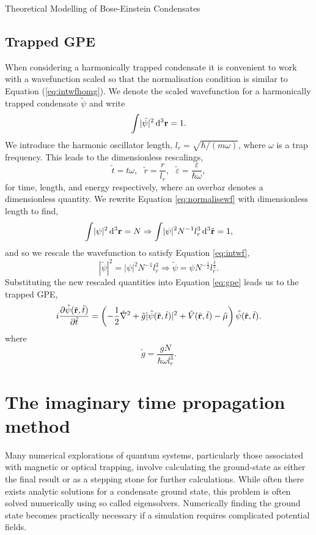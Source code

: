 \begin{chapter}{\label{cha:theoretical_model}Theoretical Modelling of Bose-Einstein Condensates}
	\subsection{\label{section:gpedimlesstrap} Trapped GPE}
		When considering a harmonically trapped condensate it is convenient to work with a wavefunction scaled so that the normalisation condition is similar to Equation (\ref{eq:intwfhomg}). We denote the scaled wavefunction for a harmonically trapped condensate $\tilde{\psi}$ and write
		\begin{equation}\label{eq:intwf}
			\int \! |\tilde{\psi}|^2 \, \mathrm{d}^3{\bf r} = 1.
		\end{equation}
		We introduce the harmonic oscillator length, $l_r = \sqrt{\hbar/(m\omega)}$, where $\omega$ is a trap frequency. This leads to the dimensionless rescalings,
		\begin{equation}
			\tilde{t} = t\omega, ~~~ \tilde{r} = \frac{r}{l_r}, ~~~ \tilde{\varepsilon}= \frac{\varepsilon}{\hbar\omega},
		\end{equation}
		for time, length, and energy respectively, where an overbar denotes a dimensionless quantity.
		We rewrite Equation \ref{eq:normalisewf} with dimensionless length to find,
		\begin{equation}
			\int \! |\psi|^2 \, \mathrm{d}^3{\bf r} = N \Rightarrow \int \! |\psi|^2 N^{-1} l_r^3 \, \mathrm{d}^3\tilde{\bf r} = 1,
		\end{equation}
		and so we rescale the wavefunction to satisfy Equation \ref{eq:intwf},
		\begin{equation}
			 |\tilde{\psi}|^2 = |\psi|^2 N^{-1} l_r^3 \Rightarrow \tilde{\psi} = \psi N^{-\frac{1}{2}} l_r^\frac{3}{2}.
		\end{equation}
	Substituting the new rescaled quantities into Equation \ref{eq:gpe} leads us to the trapped GPE,
	\begin{equation}\label{eq:dimgpetrapped}
		i\frac{\partial\tilde{\psi}({\tilde{\bf r}},\tilde{t})}{\partial {\tilde{t}}} = \left( -\frac{1}{2}\tilde{\nabla}^2 + \tilde{g}|\tilde{\psi}({\tilde{\bf r}},\tilde{t})|^2 + \tilde{V}({\tilde{\bf r}},\tilde{t}) - \tilde{\mu} \right) \tilde{\psi}({\tilde{\bf r}},\tilde{t}).
	\end{equation}
	where
	\begin{equation}
		 \tilde{g} = \frac{gN}{\hbar \omega l_r^3}.
	\end{equation}
\section{\label{section:imagTime} The imaginary time propagation method}
Many numerical explorations of quantum systems, particularly those associated with magnetic or optical trapping,  involve calculating the ground-state as either the final result or as a stepping stone for further calculations. While often there exists analytic solutions for a condensate ground state, this problem is often solved numerically using so called eigensolvers. Numerically finding the ground state becomes practically necessary if a simulation requires complicated potential fields.


\end{chapter}
